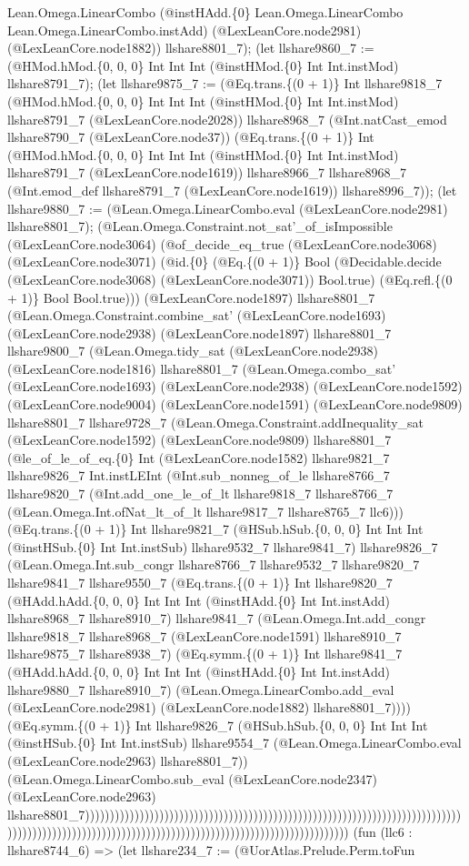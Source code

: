 \documentclass[11pt]{article}
\begin{document}
Lean.Omega.LinearCombo (@instHAdd.\{0\} Lean.Omega.LinearCombo Lean.Omega.LinearCombo.instAdd) (@LexLeanCore.node2981) (@LexLeanCore.node1882)) llshare8801\_7); (let llshare9860\_7 := (@HMod.hMod.\{0, 0, 0\} Int Int Int (@instHMod.\{0\} Int Int.instMod) llshare8791\_7); (let llshare9875\_7 := (@Eq.trans.\{(0 + 1)\} Int llshare9818\_7 (@HMod.hMod.\{0, 0, 0\} Int Int Int (@instHMod.\{0\} Int Int.instMod) llshare8791\_7 (@LexLeanCore.node2028)) llshare8968\_7 (@Int.natCast\_emod llshare8790\_7 (@LexLeanCore.node37)) (@Eq.trans.\{(0 + 1)\} Int (@HMod.hMod.\{0, 0, 0\} Int Int Int (@instHMod.\{0\} Int Int.instMod) llshare8791\_7 (@LexLeanCore.node1619)) llshare8966\_7 llshare8968\_7 (@Int.emod\_def llshare8791\_7 (@LexLeanCore.node1619)) llshare8996\_7)); (let llshare9880\_7 := (@Lean.Omega.LinearCombo.eval (@LexLeanCore.node2981) llshare8801\_7); (@Lean.Omega.Constraint.not\_sat'\_of\_isImpossible (@LexLeanCore.node3064) (@of\_decide\_eq\_true (@LexLeanCore.node3068) (@LexLeanCore.node3071) (@id.\{0\} (@Eq.\{(0 + 1)\} Bool (@Decidable.decide (@LexLeanCore.node3068) (@LexLeanCore.node3071)) Bool.true) (@Eq.refl.\{(0 + 1)\} Bool Bool.true))) (@LexLeanCore.node1897) llshare8801\_7 (@Lean.Omega.Constraint.combine\_sat' (@LexLeanCore.node1693) (@LexLeanCore.node2938) (@LexLeanCore.node1897) llshare8801\_7 llshare9800\_7 (@Lean.Omega.tidy\_sat (@LexLeanCore.node2938) (@LexLeanCore.node1816) llshare8801\_7 (@Lean.Omega.combo\_sat' (@LexLeanCore.node1693) (@LexLeanCore.node2938) (@LexLeanCore.node1592) (@LexLeanCore.node9004) (@LexLeanCore.node1591) (@LexLeanCore.node9809) llshare8801\_7 llshare9728\_7 (@Lean.Omega.Constraint.addInequality\_sat (@LexLeanCore.node1592) (@LexLeanCore.node9809) llshare8801\_7 (@le\_of\_le\_of\_eq.\{0\} Int (@LexLeanCore.node1582) llshare9821\_7 llshare9826\_7 Int.instLEInt (@Int.sub\_nonneg\_of\_le llshare8766\_7 llshare9820\_7 (@Int.add\_one\_le\_of\_lt llshare9818\_7 llshare8766\_7 (@Lean.Omega.Int.ofNat\_lt\_of\_lt llshare9817\_7 llshare8765\_7 llc6))) (@Eq.trans.\{(0 + 1)\} Int llshare9821\_7 (@HSub.hSub.\{0, 0, 0\} Int Int Int (@instHSub.\{0\} Int Int.instSub) llshare9532\_7 llshare9841\_7) llshare9826\_7 (@Lean.Omega.Int.sub\_congr llshare8766\_7 llshare9532\_7 llshare9820\_7 llshare9841\_7 llshare9550\_7 (@Eq.trans.\{(0 + 1)\} Int llshare9820\_7 (@HAdd.hAdd.\{0, 0, 0\} Int Int Int (@instHAdd.\{0\} Int Int.instAdd) llshare8968\_7 llshare8910\_7) llshare9841\_7 (@Lean.Omega.Int.add\_congr llshare9818\_7 llshare8968\_7 (@LexLeanCore.node1591) llshare8910\_7 llshare9875\_7 llshare8938\_7) (@Eq.symm.\{(0 + 1)\} Int llshare9841\_7 (@HAdd.hAdd.\{0, 0, 0\} Int Int Int (@instHAdd.\{0\} Int Int.instAdd) llshare9880\_7 llshare8910\_7) (@Lean.Omega.LinearCombo.add\_eval (@LexLeanCore.node2981) (@LexLeanCore.node1882) llshare8801\_7)))) (@Eq.symm.\{(0 + 1)\} Int llshare9826\_7 (@HSub.hSub.\{0, 0, 0\} Int Int Int (@instHSub.\{0\} Int Int.instSub) llshare9554\_7 (@Lean.Omega.LinearCombo.eval (@LexLeanCore.node2963) llshare8801\_7)) (@Lean.Omega.LinearCombo.sub\_eval (@LexLeanCore.node2347) (@LexLeanCore.node2963) llshare8801\_7))))))))))))))))))))))))))))))))))))))))))))))))))))))))))))))))))))))))))))))))))))))))))))))))))))))))))))))))))))))))))))))))))))))))))))))))) (fun (llc6 : llshare8744\_6) => (let llshare234\_7 := (@UorAtlas.Prelude.Perm.toFun 
\end{document}
